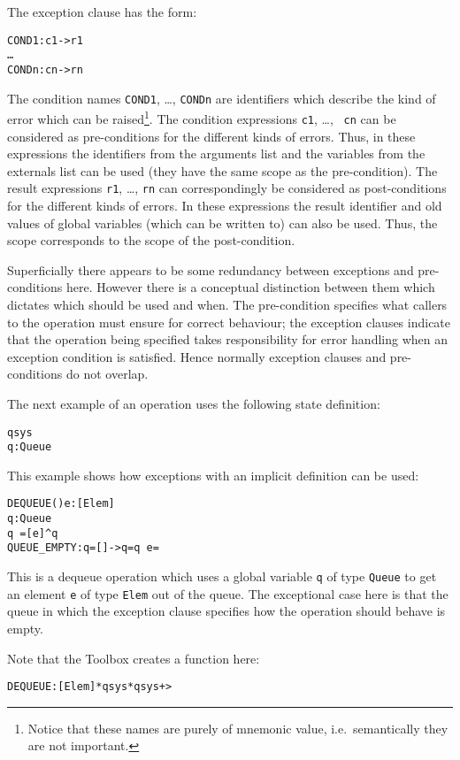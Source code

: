 \documentclass[\pformat,12pt]{article}
\begin{document}
\begin{description}
The exception clause has the form:
\begin{alltt}
    COND1: c1 -> r1
       \ldots
       CONDn: cn -> rn
\end{alltt}
The condition names {\tt COND1}, \ldots, {\tt CONDn} are identifiers
which describe the kind of error which can be raised\footnote{Notice
that these names are purely of mnemonic value, i.e.\ semantically they
are not important.}. The condition expressions {\tt c1}, \ldots, {\tt
cn} can be considered as pre-conditions for the different kinds of
errors. Thus, in these expressions the identifiers from the arguments
list and the variables from the externals list can be used (they have
the same scope as the pre-condition). The result expressions {\tt r1},
\ldots, {\tt rn} can correspondingly be considered as post-conditions
for the different kinds of errors. In these expressions the result
identifier and old values of global variables (which can be written
to) can also be used. Thus, the scope corresponds to the scope of the
post-condition.

Superficially there appears to be some redundancy between exceptions
and pre-conditions here. However there is a conceptual distinction
between them which dictates which should be used and when. The
pre-condition specifies what callers  to the operation must ensure for
correct behaviour; the exception clauses indicate that the operation
being specified takes responsibility for error handling when an
exception condition is satisfied. Hence normally exception clauses and
pre-conditions do not overlap.

The next example of an operation uses the following state definition:
\begin{alltt}
   qsys 
    q : Queue
\end{alltt}    
This example shows how exceptions with an implicit definition can be used:
\begin{alltt}
  DEQUEUE() e: [Elem]
    q : Queue
   q~ = [e] ^ q
   QUEUE_EMPTY: q = [] -> q = q~  e = 
\end{alltt}

This is a dequeue operation which uses a global variable {\tt q} of
type {\tt Queue} to get an element {\tt e} of type {\tt Elem} out of
the queue. The exceptional case here is that the queue in
which the exception clause specifies how the operation should
behave is empty.

Note that the Toolbox creates a function here:
\begin{alltt}
  DEQUEUE: [Elem] * qsys * qsys +> 
\end{alltt}


\end{description}
\end{document}

